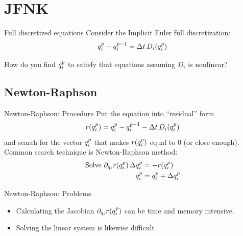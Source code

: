 \documentclass[10pt,t,xcolor=table,compress]{UWMadBeamer}
\newenvironment{Itemize}
    {\begin{itemize}\setlength{\itemsep}{0.8em}\setlength{\leftmargin}{0.0em}\setlength{\labelwidth}{0em}}
    {\end{itemize}}
\begin{document}
\section{JFNK}
    \begin{frame}{Full discretized equations}
        Consider the Implicit Euler full discretization:
        \begin{equation}
            \qi^{p} - \qi^{p-1} = \Delta{t}\,D_i(\qi^{p})
        \end{equation}
        
        How do you find $q_i^{p}$ to satisfy that equations assuming $D_i$ is nonlinear?
    \end{frame}
    
    \subsection*{Newton-Raphson}
    \begin{frame}{Newton-Raphson: Procedure}
        Put the equation into ``residual'' form
        \begin{equation}
            r(\qi^{p}) = \qi^{p} - \qi^{p-1} - \Delta{t}\,D_i(\qi^{p})
        \end{equation}
        and search for the vector $q_i^{p}$ that makes $r(q_i^{p})$ equal to $0$ (or close enough).
        \vfill
        Common search technique is Newton-Raphson method:
        \begin{align}
            \text{Solve } \partial_{\qi} r(\qi^{p})\,\Delta{\qi^{p}} &= -r(\qi^{p}) \\
            \qi^{p} &= \qi^{p} + \Delta{\qi^{p}}
        \end{align}
    \end{frame}
    \begin{frame}{Newton-Raphson: Problems}
        \begin{Itemize}
            \item{Calculating the Jacobian $\partial_{q_i} r(q_i^{p})$ can be time and memory intensive.}
            \item{Solving the linear system is likewise difficult}
        \end{Itemize}
    \end{frame}
\end{document}
